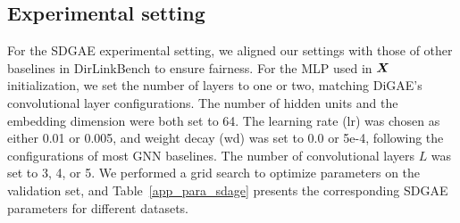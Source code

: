 \hypertarget{app_sdgae_setting}{} 
\subsection{Experimental setting}\label{app_sdgae_setting}
For the SDGAE experimental setting, we aligned our settings with those of other baselines in DirLinkBench to ensure fairness. For the MLP used in ${\bm{X}}$ initialization, we set the number of layers to one or two, matching DiGAE's convolutional layer configurations. The number of hidden units and the embedding dimension were both set to 64. The learning rate (lr) was chosen as either 0.01 or 0.005, and weight decay (wd) was set to 0.0 or 5e-4, following the configurations of most GNN baselines. The number of convolutional layers $L$ was set to 3, 4, or 5. We performed a grid search to optimize parameters on the validation set, and Table~\ref{app_para_sdage} presents the corresponding SDGAE parameters for different datasets.  


